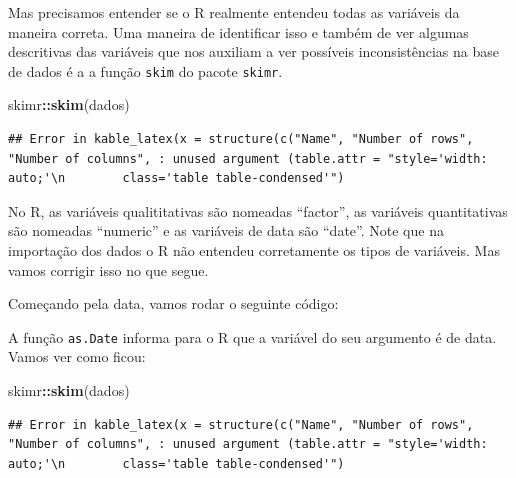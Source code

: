 \documentclass[
]{book}
\newenvironment{Shaded}{\begin{snugshade}}{\end{snugshade}}
\newcommand{\KeywordTok}[1]{\textcolor[rgb]{0.13,0.29,0.53}{\textbf{#1}}}
\newcommand{\NormalTok}[1]{#1}
\newcommand{\OperatorTok}[1]{\textcolor[rgb]{0.81,0.36,0.00}{\textbf{#1}}}
\newcommand{\StringTok}[1]{\textcolor[rgb]{0.31,0.60,0.02}{#1}}
\begin{document}
Mas precisamos entender se o R realmente entendeu todas as variáveis da maneira correta. Uma maneira de identificar isso e também de ver algumas descritivas das variáveis que nos auxiliam a ver possíveis inconsistências na base de dados é a a função \texttt{skim} do pacote \texttt{skimr}.

\begin{Shaded}
\begin{Highlighting}[]
\NormalTok{skimr}\OperatorTok{::}\KeywordTok{skim}\NormalTok{(dados)}
\end{Highlighting}
\end{Shaded}

\begin{verbatim}
## Error in kable_latex(x = structure(c("Name", "Number of rows", "Number of columns", : unused argument (table.attr = "style='width: auto;'\n        class='table table-condensed'")
\end{verbatim}

No R, as variáveis qualititativas são nomeadas ``factor'', as variáveis quantitativas são nomeadas ``numeric'' e as variáveis de data são ``date''. Note que na importação dos dados o R não entendeu corretamente os tipos de variáveis. Mas vamos corrigir isso no que segue.

Começando pela data, vamos rodar o seguinte código:

\begin{Shaded}
\end{Shaded}

A função \texttt{as.Date} informa para o R que a variável do seu argumento é de data. Vamos ver como ficou:

\begin{Shaded}
\begin{Highlighting}[]
\NormalTok{skimr}\OperatorTok{::}\KeywordTok{skim}\NormalTok{(dados)}
\end{Highlighting}
\end{Shaded}

\begin{verbatim}
## Error in kable_latex(x = structure(c("Name", "Number of rows", "Number of columns", : unused argument (table.attr = "style='width: auto;'\n        class='table table-condensed'")
\end{verbatim}
\end{document}
